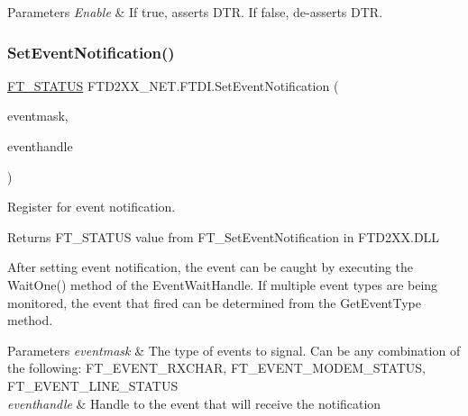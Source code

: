 \begin{DoxyParams}{Parameters}
{\em Enable} & If true, asserts D\+TR. If false, de-\/asserts D\+TR.\\
\hline
\end{DoxyParams}
\mbox{\label{class_f_t_d2_x_x___n_e_t_1_1_f_t_d_i_a4bd0ad132e9632a6b7423c21e9a20be4}} 
\subsubsection{\texorpdfstring{SetEventNotification()}{SetEventNotification()}}
{\footnotesize\ttfamily \mbox{\hyperlink{class_f_t_d2_x_x___n_e_t_1_1_f_t_d_i_aabe20ad905cc4ccc1e35dd5b877d9a83}{F\+T\+\_\+\+S\+T\+A\+T\+US}} F\+T\+D2\+X\+X\+\_\+\+N\+E\+T.\+F\+T\+D\+I.\+Set\+Event\+Notification (\begin{DoxyParamCaption}\item[{U\+Int32}]{eventmask,  }\item[{Event\+Wait\+Handle}]{eventhandle }\end{DoxyParamCaption})}



Register for event notification. 

\begin{DoxyReturn}{Returns}
F\+T\+\_\+\+S\+T\+A\+T\+US value from F\+T\+\_\+\+Set\+Event\+Notification in F\+T\+D2\+X\+X.\+D\+LL
\end{DoxyReturn}


After setting event notification, the event can be caught by executing the Wait\+One() method of the Event\+Wait\+Handle. If multiple event types are being monitored, the event that fired can be determined from the Get\+Event\+Type method.


\begin{DoxyParams}{Parameters}
{\em eventmask} & The type of events to signal. Can be any combination of the following\+: F\+T\+\_\+\+E\+V\+E\+N\+T\+\_\+\+R\+X\+C\+H\+AR, F\+T\+\_\+\+E\+V\+E\+N\+T\+\_\+\+M\+O\+D\+E\+M\+\_\+\+S\+T\+A\+T\+US, F\+T\+\_\+\+E\+V\+E\+N\+T\+\_\+\+L\+I\+N\+E\+\_\+\+S\+T\+A\+T\+US\\
\hline
{\em eventhandle} & Handle to the event that will receive the notification\\
\hline
\end{DoxyParams}
\mbox{\label{class_f_t_d2_x_x___n_e_t_1_1_f_t_d_i_ad7f6e8173e6abde2dc3b839e1ce7d67c}} 
